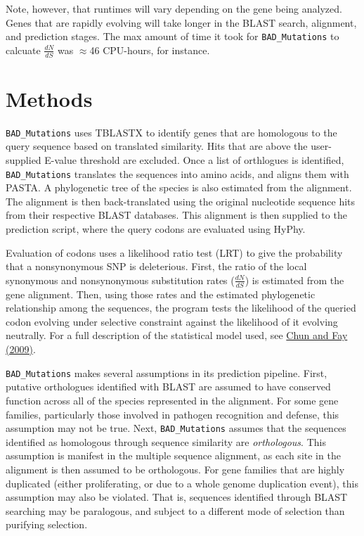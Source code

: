 \documentclass[12pt]{article}
\newcommand{\BM}{\texttt{BAD\_Mutations} }
\begin{document}
\par Note, however, that runtimes will vary depending on the gene being
analyzed. Genes that are rapidly evolving will take longer in the BLAST search,
alignment, and prediction stages. The max amount of time it took for \BM to
calcuate $\frac{dN}{dS}$ was $\approx$46 CPU-hours, for instance.

\section*{Methods}
\par \BM uses TBLASTX to identify genes that are homologous to the query
sequence based on translated similarity. Hits that are above the user-supplied
E-value threshold are excluded. Once a list of orthlogues is identified,
\BM translates the sequences into amino acids, and aligns them with PASTA. A
phylogenetic tree of the species is also estimated from the alignment. The
alignment is then back-translated using the original nucleotide sequence hits
from their respective BLAST databases. This alignment is then supplied to the
prediction script, where the query codons are evaluated using HyPhy.

\par Evaluation of codons uses a likelihood ratio test (LRT) to give the
probability that a nonsynonymous SNP is deleterious. First, the ratio of the
local synonymous and nonsynonymous substitution rates ($\frac{dN}{dS}$) is
estimated from the gene alignment. Then, using those rates and the estimated
phylogenetic relationship among the sequences, the program tests the
likelihood of the queried codon evolving under selective constraint against the
likelihood of it evolving neutrally. For a full description of the statistical
model used, see 
\href{http://genome.cshlp.org/content/19/9/1553.abstract}{Chun and Fay (2009)}.

\par \BM makes several assumptions in its prediction pipeline. First, putative
orthologues identified with BLAST are assumed to have conserved function across
all of the species represented in the alignment. For some gene families,
particularly those involved in pathogen recognition and defense, this assumption
may not be true. Next, \BM assumes that the sequences identified as homologous
through sequence similarity are \textit{orthologous}. This assumption is
manifest in the multiple sequence alignment, as each site in the alignment is
then assumed to be orthologous. For gene families that are highly duplicated
(either proliferating, or due to a whole genome duplication event), this
assumption may also be violated. That is, sequences identified through BLAST
searching may be paralogous, and subject to a different mode of selection than
purifying selection.
\end{document}
